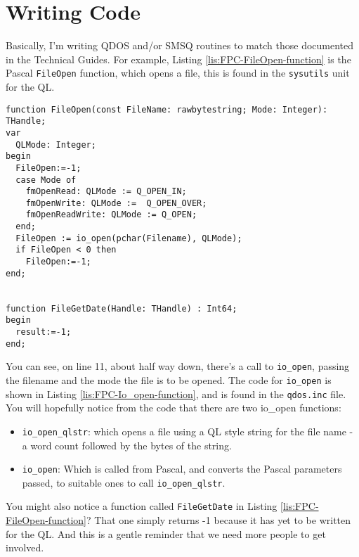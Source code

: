 \section{Writing Code}

Basically, I'm writing QDOS and/or SMSQ routines to match those documented
in the Technical Guides. For example, Listing \ref{lis:FPC-FileOpen-function}
is the Pascal \texttt{FileOpen} function, which opens a file, this
is found in the \texttt{sysutils} unit for the QL.

\begin{lstlisting}[caption={FPC FileOpen function},label={lis:FPC-FileOpen-function}]
function FileOpen(const FileName: rawbytestring; Mode: Integer): THandle;
var
  QLMode: Integer;
begin
  FileOpen:=-1;
  case Mode of
    fmOpenRead: QLMode := Q_OPEN_IN;
    fmOpenWrite: QLMode :=  Q_OPEN_OVER;
    fmOpenReadWrite: QLMode := Q_OPEN;
  end;
  FileOpen := io_open(pchar(Filename), QLMode);
  if FileOpen < 0 then
    FileOpen:=-1;
end;


function FileGetDate(Handle: THandle) : Int64;
begin
  result:=-1;
end;

\end{lstlisting}

You can see, on line 11, about half way down, there's a call to \texttt{io\_open},
passing the filename and the mode the file is to be opened. The code
for \texttt{io\_open} is shown in Listing \ref{lis:FPC-Io_open-function},
and is found in the \texttt{qdos.inc} file. You will hopefully notice
from the code that there are two io\_open functions:
\begin{itemize}
\item \texttt{io\_open\_qlstr}: which opens a file using a QL style string
for the file name - a word count followed by the bytes of the string.
\item \texttt{io\_open}: Which is called from Pascal, and converts the Pascal
parameters passed, to suitable ones to call \texttt{io\_open\_qlstr}.
\end{itemize}
You might also notice a function called \texttt{FileGetDate} in Listing
\ref{lis:FPC-FileOpen-function}? That one simply returns -1 because
it has yet to be written for the QL. And this is a gentle reminder
that we need more people to get involved.

